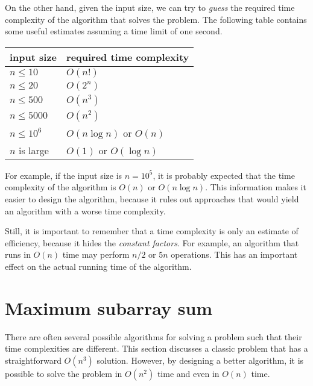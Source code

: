 On the other hand, given the input size,
we can try to \emph{guess}
the required time complexity of the algorithm
that solves the problem.
The following table contains some useful estimates
assuming a time limit of one second.

\begin{center}
\begin{tabular}{ll}
input size & required time complexity \\
\hline
$n \le 10$ & $O(n!)$ \\
$n \le 20$ & $O(2^n)$ \\
$n \le 500$ & $O(n^3)$ \\
$n \le 5000$ & $O(n^2)$ \\
$n \le 10^6$ & $O(n \log n)$ or $O(n)$ \\
$n$ is large & $O(1)$ or $O(\log n)$ \\
\end{tabular}
\end{center}

For example, if the input size is $n=10^5$,
it is probably expected that the time
complexity of the algorithm is $O(n)$ or $O(n \log n)$.
This information makes it easier to design the algorithm,
because it rules out approaches that would yield
an algorithm with a worse time complexity.


Still, it is important to remember that a
time complexity is only an estimate of efficiency,
because it hides the \emph{constant factors}.
For example, an algorithm that runs in $O(n)$ time
may perform $n/2$ or $5n$ operations.
This has an important effect on the actual
running time of the algorithm.

\section{Maximum subarray sum}


There are often several possible algorithms
for solving a problem such that their
time complexities are different.
This section discusses a classic problem that
has a straightforward $O(n^3)$ solution.
However, by designing a better algorithm, it
is possible to solve the problem in $O(n^2)$
time and even in $O(n)$ time.

